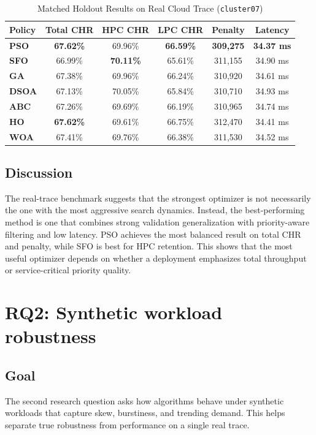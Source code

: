 \documentclass[10pt,journal,compsoc]{IEEEtran}
\begin{document}
\begin{table}[htbp]
\centering
\caption{Matched Holdout Results on Real Cloud Trace (\texttt{cluster07})}
\label{tab:rq1}
\begin{tabular}{lccccc}
\toprule
\textbf{Policy} & \textbf{Total CHR} & \textbf{HPC CHR} & \textbf{LPC CHR} & \textbf{Penalty} & \textbf{Latency} \\
\midrule
\textbf{PSO}  & \textbf{67.62\%} & 69.96\% & \textbf{66.59\%} & \textbf{309,275} & \textbf{34.37 ms} \\
\textbf{SFO}  & 66.99\% & \textbf{70.11\%} & 65.61\% & 311,155 & 34.90 ms \\
\textbf{GA}   & 67.38\% & 69.96\% & 66.24\% & 310,920 & 34.61 ms \\
\textbf{DSOA} & 67.13\% & 70.05\% & 65.84\% & 310,710 & 34.93 ms \\
\textbf{ABC}  & 67.26\% & 69.69\% & 66.19\% & 310,965 & 34.74 ms \\
\textbf{HO}   & \textbf{67.62\%} & 69.61\% & 66.75\% & 312,470 & 34.41 ms \\
\textbf{WOA}  & 67.41\% & 69.76\% & 66.38\% & 311,530 & 34.52 ms \\
\bottomrule
\end{tabular}
\end{table}

\subsection{Discussion}
The real-trace benchmark suggests that the strongest optimizer is not necessarily the one with the most aggressive search dynamics. Instead, the best-performing method is one that combines strong validation generalization with priority-aware filtering and low latency. PSO achieves the most balanced result on total CHR and penalty, while SFO is best for HPC retention. This shows that the most useful optimizer depends on whether a deployment emphasizes total throughput or service-critical priority quality.

\section{RQ2: Synthetic workload robustness}
\subsection{Goal}
The second research question asks how algorithms behave under synthetic workloads that capture skew, burstiness, and trending demand. This helps separate true robustness from performance on a single real trace.
\end{document}

